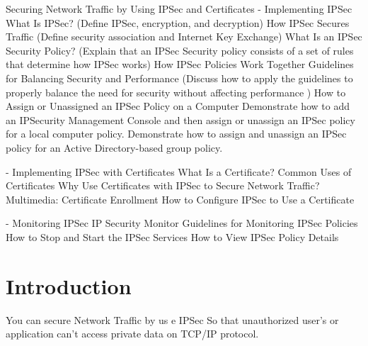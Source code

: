 \documentclass[conference, compsoc]{IEEEtran}
\begin{document}
\begin{Overview}
	Securing Network Traffic by Using IPSec and Certificates
- Implementing IPSec 
	What Is IPSec? (Define IPSec, encryption, and decryption)
How IPSec Secures Traffic (Define security association and Internet Key Exchange)
What Is an IPSec Security Policy? 
  	(Explain that an IPSec Security policy consists of a set of rules that determine how IPSec works)
How IPSec Policies Work Together
Guidelines for Balancing Security and Performance 
	(Discuss how to apply the guidelines to properly balance the need for security without  affecting 
		performance )
How to Assign or Unassigned an IPSec Policy on a Computer 
Demonstrate how to add an IPSecurity Management Console and then assign or unassign an IPSec policy for a local computer policy.
Demonstrate how to assign and unassign an IPSec policy for an Active Directory-based group policy.

- Implementing IPSec with Certificates
What Is a Certificate?
Common Uses of Certificates
Why Use Certificates with IPSec to Secure Network Traffic?
Multimedia: Certificate Enrollment
How to Configure IPSec to Use a Certificate

- Monitoring IPSec
IP Security Monitor 
Guidelines for Monitoring IPSec Policies
How to Stop and Start the IPSec Services
How to View IPSec Policy Details


\end{Overview}





%
\IEEEpeerreviewmaketitle



\section{Introduction}
You can secure Network Traffic by us e IPSec So that unauthorized user’s or application can't access private data on TCP/IP protocol.
\end{document}
